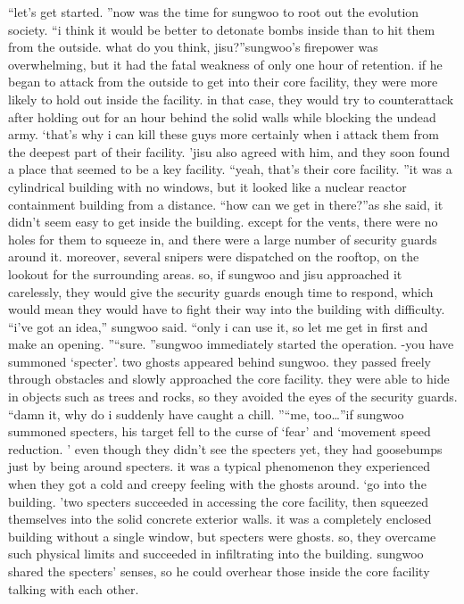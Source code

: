 “let’s get started.
”now was the time for sungwoo to root out the evolution society.
“i think it would be better to detonate bombs inside than to hit them from the outside.
 what do you think, jisu?”sungwoo’s firepower was overwhelming, but it had the fatal weakness of only one hour of retention.
 if he began to attack from the outside to get into their core facility, they were more likely to hold out inside the facility.
 in that case, they would try to counterattack after holding out for an hour behind the solid walls while blocking the undead army.
‘that’s why i can kill these guys more certainly when i attack them from the deepest part of their facility.
’jisu also agreed with him, and they soon found a place that seemed to be a key facility.
“yeah, that’s their core facility.
”it was a cylindrical building with no windows, but it looked like a nuclear reactor containment building from a distance.
“how can we get in there?”as she said, it didn’t seem easy to get inside the building.
 except for the vents, there were no holes for them to squeeze in, and there were a large number of security guards around it.
moreover, several snipers were dispatched on the rooftop, on the lookout for the surrounding areas.
so, if sungwoo and jisu approached it carelessly, they would give the security guards enough time to respond, which would mean they would have to fight their way into the building with difficulty.
“i’ve got an idea,” sungwoo said.
 “only i can use it, so let me get in first and make an opening.
”“sure.
”sungwoo immediately started the operation.
-you have summoned ‘specter’.
two ghosts appeared behind sungwoo.
 they passed freely through obstacles and slowly approached the core facility.
 they were able to hide in objects such as trees and rocks, so they avoided the eyes of the security guards.
“damn it, why do i suddenly have caught a chill.
”“me, too…”if sungwoo summoned specters, his target fell to the curse of ‘fear’ and ‘movement speed reduction.
’ even though they didn’t see the specters yet, they had goosebumps just by being around specters.
 it was a typical phenomenon they experienced when they got a cold and creepy feeling with the ghosts around.
‘go into the building.
’two specters succeeded in accessing the core facility, then squeezed themselves into the solid concrete exterior walls.
 it was a completely enclosed building without a single window, but specters were ghosts.
 so, they overcame such physical limits and succeeded in infiltrating into the building.
sungwoo shared the specters’ senses, so he could overhear those inside the core facility talking with each other.
